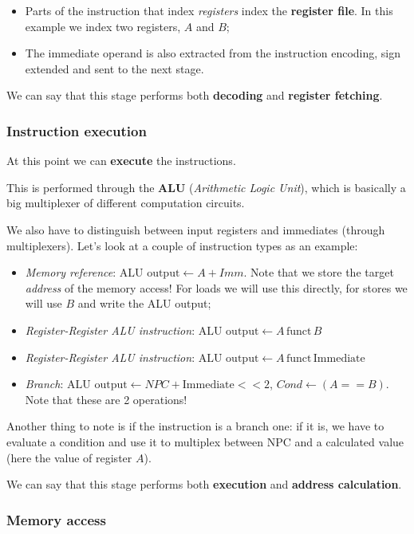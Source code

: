 \documentclass[a4paper,11pt]{article}
\begin{document}
\begin{itemize}
	\item Parts of the instruction that index \textit{registers} index the \textbf{register file}. In this example we index two registers, $A$ and $B$;
	\item The immediate operand is also extracted from the instruction encoding, sign extended and sent to the next stage.
\end{itemize}

We can say that this stage performs both \textbf{decoding} and \textbf{register fetching}.

\subsubsection{Instruction execution}

At this point we can \textbf{execute} the instructions.

This is performed through the \textbf{ALU} (\textit{Arithmetic Logic Unit}), which is basically a big multiplexer of different computation circuits.

We also have to distinguish between input registers and immediates (through multiplexers).
Let's look at a couple of instruction types as an example:
\begin{itemize}
	\item \textit{Memory reference}: $\text{ALU output} \leftarrow A + Imm$. Note that we store the target \textit{address} of the memory access! For loads we will use this directly, for stores we will use $B$ and write the ALU output;
	\item \textit{Register-Register ALU instruction}: $\text{ALU output} \leftarrow A \, \text{funct} \, B$
	\item \textit{Register-Register ALU instruction}: $\text{ALU output} \leftarrow A \, \text{funct} \, \text{Immediate}$
	\item \textit{Branch}: $\text{ALU output} \leftarrow NPC + \text{Immediate} << 2$, $Cond \leftarrow (A == B)$. Note that these are 2 operations!
\end{itemize}

Another thing to note is if the instruction is a branch one: if it is, we have to evaluate a condition and use it to multiplex between NPC and a calculated value (here the value of register $A$).

We can say that this stage performs both \textbf{execution} and \textbf{address calculation}.

\subsubsection{Memory access}
\end{document}
